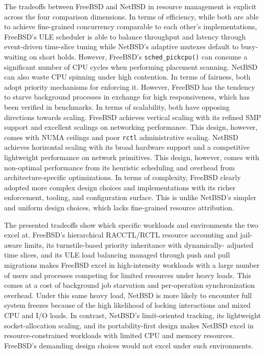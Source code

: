 The tradeoffs between FreeBSD and NetBSD in resource management is explicit across the four comparison dimensions.
In terms of efficiency, while both are able to achieve fine-grained concurrency comparable to each other's implementations,
FreeBSD's ULE scheduler is able to balance throughput and latency through event-driven time-slice tuning while NetBSD's
adaptive mutexes default to busy-waiting on short holds. However, FreeBSD's \texttt{sched\_pickcpu()} can consume
a significant number of CPU cycles when performing placement scanning. NetBSD can also waste CPU spinning under high
contention. In terms of fairness, both adopt priority mechanisms for enforcing it. However, FreeBSD has the tendency
to starve background processes in exchange for high responsiveness, which has been verified in benchmarks. In terms
of scalability, both have opposing directions towards scaling. FreeBSD achieves vertical scaling with its refined
SMP support and excellent scalings on networking performance. This design, however, comes with NUMA ceilings and
poor \texttt{rctl} administrative scaling. NetBSD achieves horizontal scaling with its broad hardware support and
a competitive lightweight performance on network primitives. This design, however, comes with non-optimal performance
from its heuristic scheduling and overhead from architecture-specific optimizations. In terms of complexity,
FreeBSD clearly adopted more complex design choices and implementations with its richer enforcement, tooling,
and configuration surface. This is unlike NetBSD's simpler and uniform design choices, which lacks fine-grained
resource attribution.

The presented tradeoffs show which specific workloads and environments the two excel at. FreeBSD's hierarchical
RACCTL/RCTL resource accounting and jail-aware limits, its turnstile-based priority inheritance with dynamically-
adjusted time slices, and its ULE load balancing managed through push and pull migrations makes FreeBSD excel
in high-intensity workloads with a large number of users and processes competing for limited resources under
heavy loads. This comes at a cost of background job starvation and per-operation synchronization overhead.
Under this same heavy load, NetBSD is more likely to encounter full system freezes because of the high likelihood
of locking interactions and mixed CPU and I/O loads. In contrast, NetBSD's limit-oriented tracking, its lightweight
socket-allocation scaling, and its portability-first design makes NetBSD excel in resource-constrained
workloads with limited CPU and memory resources. FreeBSD's demanding design choices would not excel under
such environments.
